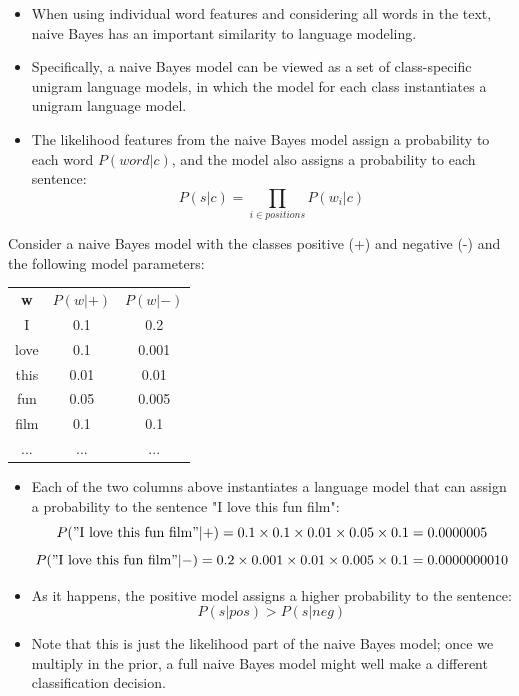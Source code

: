 \documentclass{book}
\begin{document}
\begin{itemize}
 \item When using individual word features and considering all words in the text, naive Bayes has an important similarity to language modeling. 
 \item Specifically, a naive Bayes model can be viewed as a set of class-specific unigram language models, in which the model for each class instantiates a unigram language model.
 \item The likelihood features from the naive Bayes model assign a probability to each word $P(word|c)$, and the model also assigns a probability to each sentence:
\[P(s|c) = \prod_{i\in positions} P(w_i|c)\]
\end{itemize}
Consider a naive Bayes model with the classes positive (+) and negative (-) and the following model parameters:
\begin{center}
\begin{tabular}{ccc}
\textbf{w} & $P(w|+)$ & $P(w|-)$ \\
I & 0.1 & 0.2 \\
love & 0.1 & 0.001 \\
this & 0.01 & 0.01 \\
fun & 0.05 & 0.005 \\
film & 0.1 & 0.1 \\
... & ... & ...
\end{tabular}
\end{center}



\begin{itemize}
 \item  Each of the two columns above instantiates a language model that can assign a probability to the sentence "I love this fun film":
\[P("\text{I love this fun film}"|+) = 0.1 \times 0.1 \times 0.01 \times 0.05 \times 0.1 = 0.0000005\]
\[P("\text{I love this fun film}"|-) = 0.2 \times 0.001 \times 0.01 \times 0.005 \times 0.1 = 0.0000000010\]

\item As it happens, the positive model assigns a higher probability to the sentence:
\[P(s|pos) > P(s|neg)\]

\item Note that this is just the likelihood part of the naive Bayes model; once we multiply in the prior, a full naive Bayes model might well make a different classification decision.
\end{itemize}
\end{document}
